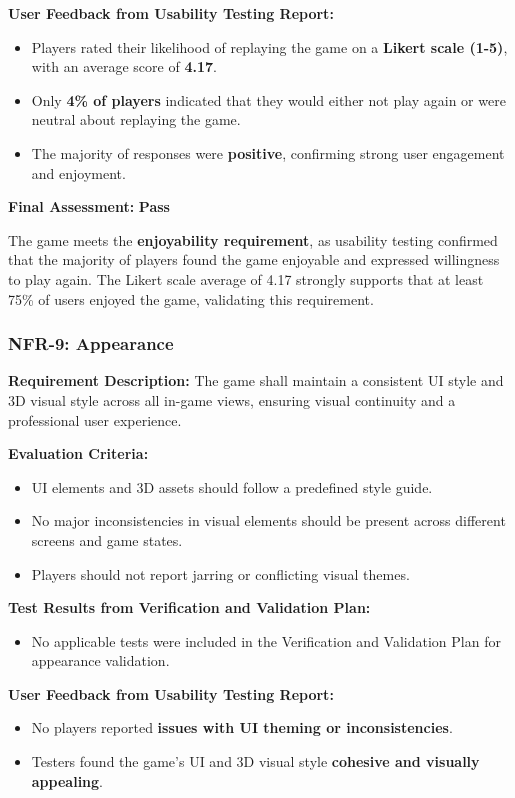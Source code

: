 \documentclass[12pt, titlepage]{article}
\begin{document}
\textbf{User Feedback from Usability Testing Report:}  
\begin{itemize}
    \item Players rated their likelihood of replaying the game on a \textbf{Likert scale (1-5)}, with an average score of \textbf{4.17}.
    \item Only \textbf{4\% of players} indicated that they would either not play again or were neutral about replaying the game.
    \item The majority of responses were \textbf{positive}, confirming strong user engagement and enjoyment.
\end{itemize}

\textbf{Final Assessment:} \textbf{Pass} 
 
The game meets the \textbf{enjoyability requirement}, as usability testing confirmed that the majority of players found the game enjoyable and expressed willingness to play again. The Likert scale average of 4.17 strongly supports that at least 75\% of users enjoyed the game, validating this requirement.

\subsubsection{NFR-9: Appearance}

\textbf{Requirement Description:}  
The game shall maintain a consistent UI style and 3D visual style across all in-game views, ensuring visual continuity and a professional user experience.

\textbf{Evaluation Criteria:}  
\begin{itemize}
    \item UI elements and 3D assets should follow a predefined style guide.
    \item No major inconsistencies in visual elements should be present across different screens and game states.
    \item Players should not report jarring or conflicting visual themes.
\end{itemize}

\textbf{Test Results from Verification and Validation Plan:}  
\begin{itemize}
    \item No applicable tests were included in the Verification and Validation Plan for appearance validation.
\end{itemize}

\textbf{User Feedback from Usability Testing Report:}  
\begin{itemize}
    \item No players reported \textbf{issues with UI theming or inconsistencies}.
    \item Testers found the game’s UI and 3D visual style \textbf{cohesive and visually appealing}.
\end{itemize}
\end{document}

